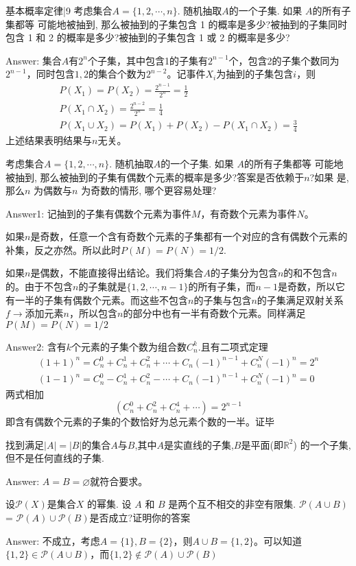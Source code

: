 \newChapter 基本概率定律|9
\exer 考虑集合$A = \{1,2,\cdots ,n\}$. 随机抽取$A$的一个子集. 如果 $A$的所有子集都等 可能地被抽到, 那么被抽到的子集包含 1 的概率是多少?被抽到的子集同时包含 1 和 2 的概率是多少?被抽到的子集包含 1 或 2 的概率是多少?\par
Answer: 集合$A$有$2^n$个子集，其中包含1的子集有$2^{n-1}$个，包含2的子集个数同为$2^{n-1}$，同时包含$1,2$的集合个数为$2^{n-2}$。记事件$X_i$为抽到的子集包含$i$，则
\begin{gather*}
P(X_1)=P(X_2)=\frac{2^{n-1}}{2^n}=\frac{1}{2} \\
P(X_1\cap X_2)=\frac{2^{n-2}}{2^n}=\frac{1}{4} \\
P(X_1\cup X_2)=P(X_1)+P(X_2)-P(X_1\cap X_2)=\frac{3}{4}
\end{gather*}
上述结果表明结果与$n$无关。

\exer 考虑集合$A = \{1,2,\cdots ,n\}$. 随机抽取$A$的一个子集. 如果 $A$的所有子集都等 可能地被抽到, 那么被抽到的子集有偶数个元素的概率是多少?答案是否依赖于$n$?如果 是, 那么$n$ 为偶数与$n$ 为奇数的情形, 哪个更容易处理?\par
Answer1: 记抽到的子集有偶数个元素为事件$M$，有奇数个元素为事件$N$。\par
如果$n$是奇数，任意一个含有奇数个元素的子集都有一个对应的含有偶数个元素的补集，反之亦然。所以此时$P(M)=P(N)=1/2$.\par
如果$n$是偶数，不能直接得出结论。我们将集合$A$的子集分为包含$n$的和不包含$n$的。由于不包含$n$的子集就是$\{1,2,\cdots,n-1\}$的所有子集，而$n-1$是奇数，所以它有一半的子集有偶数个元素。而这些不包含$n$的子集与包含$n$的子集满足双射关系$f\to$添加元素$n$，所以包含$n$的部分中也有一半有奇数个元素。同样满足$P(M)=P(N)=1/2$\par
Answer2: 含有$k$个元素的子集个数为组合数$C_n^k$.且有二项式定理
\begin{gather*}
(1+1)^n=C_n^0+C_n^1+C_n^2+\cdots+C_n(-1)^{n-1} + C_n^N(-1)^n =2^n\\
(1-1)^n=C_n^0-C_n^1+C_n^2-\cdots+C_n(-1)^{n-1} + C_n^N(-1)^n = 0
\end{gather*}
两式相加
\[(C_n^0 + C_n^2+C_n^4+\cdots)=2^{n-1}\]
即含有偶数个元素的子集的个数恰好为总元素个数的一半。证毕

\exer 找到满足$|A|=|B|$的集合$A$与$B$,其中$A$是实直线的子集,$B$是平面(即$\mathbb{R}^2$) 的一个子集, 但不是任何直线的子集.\par
Answer: $A=B=\varnothing$就符合要求。

\exer 设$\mathcal{P}(X)$是集合$X$ 的幂集. 设 $A$ 和 $B$ 是两个互不相交的非空有限集. $\mathcal{P}(A \cup B)$ = $\mathcal{P}(A)\cup\mathcal{P}(B)$是否成立?证明你的答案\par
Answer: 不成立，考虑$A=\{1\},B=\{2\}$，则$A\cup B=\{1,2\}$。可以知道$\{1,2\}\in \mathcal{P}(A\cup B)$，而$\{1,2\}\not\in \mathcal{P}(A)\cup \mathcal{P}(B)$

